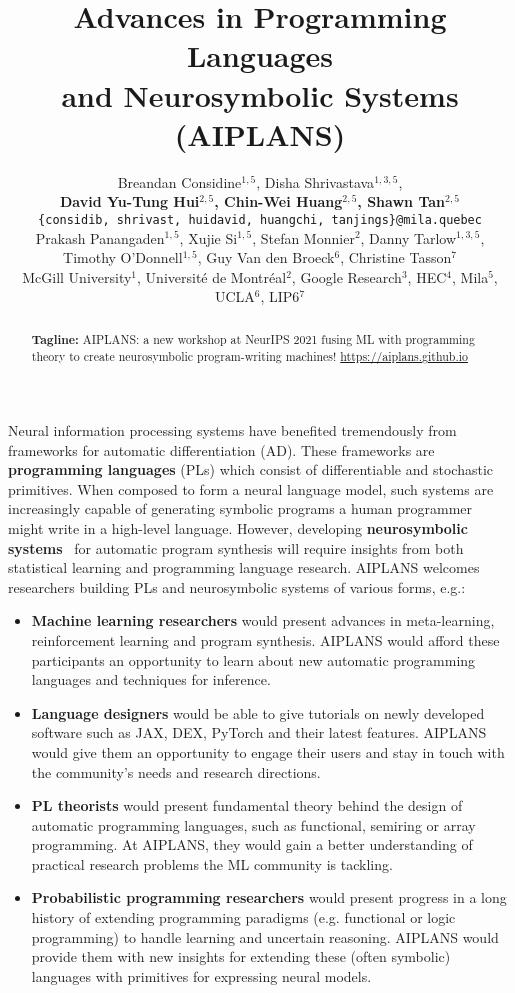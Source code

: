 \documentclass{article}
\title{Advances in Programming Languages\\ and Neurosymbolic Systems (AIPLANS)}
\author{%
    Breandan Considine$^{1, 5}$, Disha Shrivastava$^{1, 3, 5}$, \\\textbf{David Yu-Tung Hui$^{2, 5}$, Chin-Wei Huang$^{2, 5}$, Shawn Tan$^{2, 5}$} \\
    \texttt{\{considib, shrivast, huidavid, huangchi, tanjings\}@mila.quebec} \\
    Prakash Panangaden$^{1, 5}$, Xujie Si$^{1, 5}$, Stefan Monnier$^{2}$, Danny Tarlow$^{1, 3, 5}$, \\
    Timothy O'Donnell$^{1, 5}$, Guy Van den Broeck$^6$, Christine Tasson$^7$\\
    McGill University$^1$, Universit\'e de Montr\'eal$^2$, Google Research$^3$, HEC$^4$, Mila$^5$, UCLA$^6$, LIP6$^7$
}
\begin{document}
    \maketitle
    \vspace{-0.5cm}
    \begin{abstract}
        \textbf{Tagline:} AIPLANS: a new workshop at NeurIPS 2021 fusing ML with programming theory to create neurosymbolic program-writing machines!  \url{https://aiplans.github.io} %
    \end{abstract}


    Neural information processing systems have benefited tremendously from frameworks for automatic differentiation (AD). These frameworks are \textbf{programming languages} (PLs) which consist of differentiable and stochastic primitives. When composed to form a neural language model, such systems are increasingly capable of generating symbolic programs a human programmer might write in a high-level language. However, developing \textbf{neurosymbolic systems}~\cite{wermter2001present} for automatic program synthesis will require insights from both statistical learning and programming language research. AIPLANS welcomes researchers building PLs and neurosymbolic systems of various forms, e.g.:
    \begin{itemize}
        \item \textbf{Machine learning researchers} would present advances in meta-learning, reinforcement learning and program synthesis. AIPLANS would afford these participants an opportunity to learn about new automatic programming languages and techniques for inference.
        \item \textbf{Language designers} would be able to give tutorials on newly developed software such as JAX, DEX, PyTorch and their latest features. AIPLANS would give them an opportunity to engage their users and stay in touch with the community's needs and research directions.
        \item \textbf{PL theorists} would present fundamental theory behind the design of automatic programming languages, such as functional, semiring or array programming. At AIPLANS, they would gain a better understanding of practical research problems the ML community is tackling.
        \item \textbf{Probabilistic programming researchers} would present progress in a long history of extending programming paradigms (e.g. functional or logic programming) to handle learning and uncertain reasoning. AIPLANS would provide them with new insights for extending these (often symbolic) languages with primitives for expressing neural models.
    \end{itemize}
\end{document}
